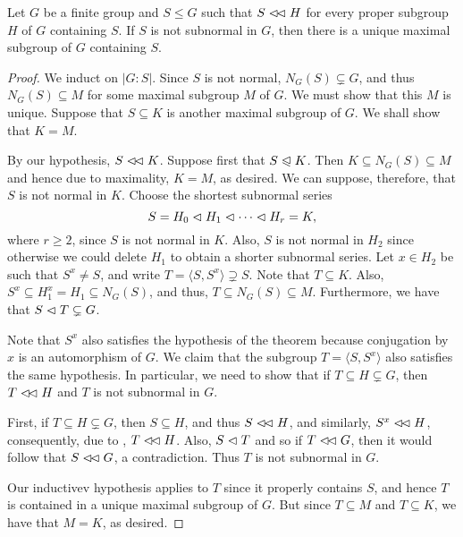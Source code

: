 \begin{theorem}
    Let $G$ be a finite group and $S\le G$ such that $S\vartriangleleft\!\vartriangleleft H$ for every proper subgroup $H$ of $G$ containing $S$. If $S$ is not subnormal in $G$, then there is a unique maximal subgroup of $G$ containing $S$.
\end{theorem}
\begin{proof}
    We induct on $|G : S|$. Since $S$ is not normal, $N_G(S)\subsetneq G$, and thus $N_G(S)\subseteq M$ for some maximal subgroup $M$ of $G$. We must show that this $M$ is unique. Suppose that $S\subseteq K$ is another maximal subgroup of $G$. We shall show that $K = M$.

    By our hypothesis, $S\vartriangleleft\!\vartriangleleft K$. Suppose first that $S\trianglelefteqslant K$. Then $K\subseteq N_G(S)\subseteq M$ and hence due to maximality, $K = M$, as desired. We can suppose, therefore, that $S$ is not normal in $K$. Choose the shortest subnormal series 
    \begin{equation*}
        S = H_0\vartriangleleft H_1\vartriangleleft\cdots\vartriangleleft H_r = K,
    \end{equation*}
    where $r\ge 2$, since $S$ is not normal in $K$. Also, $S$ is not normal in $H_2$ since otherwise we could delete $H_1$ to obtain a shorter subnormal series. Let $x\in H_2$ be such that $S^x\ne S$, and write $T = \langle S, S^x\rangle\supsetneq S$. Note that $T\subseteq K$. Also, $S^x\subseteq H_1^x = H_1\subseteq N_G(S)$, and thus, $T\subseteq N_G(S)\subseteq M$. Furthermore, we have that $S\vartriangleleft T\subsetneq G$.

    Note that $S^x$ also satisfies the hypothesis of the theorem because conjugation by $x$ is an automorphism of $G$. We claim that the subgroup $T = \langle S, S^x\rangle$ also satisfies the same hypothesis. In particular, we need to show that if $T\subseteq H\subsetneq G$, then $T\vartriangleleft\!\vartriangleleft H$ and $T$ is not subnormal in $G$.

    First, if $T\subseteq H\subsetneq G$, then $S\subseteq H$, and thus $S\vartriangleleft\!\vartriangleleft H$, and similarly, $S^x\vartriangleleft\!\vartriangleleft H$, consequently, due to , $T\vartriangleleft\!\vartriangleleft  H$. Also, $S\vartriangleleft T$ and so if $T\vartriangleleft\!\vartriangleleft G$, then it would follow that $S\vartriangleleft\!\vartriangleleft G$, a contradiction. Thus $T$ is not subnormal in $G$.

    Our inductivev hypothesis applies to $T$ since it properly contains $S$, and hence $T$ is contained in a unique maximal subgroup of $G$. But since $T\subseteq M$ and $T\subseteq K$, we have that $M = K$, as desired.
\end{proof}

